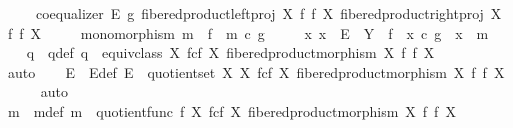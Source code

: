 \begin{isabellebody}
\ \ \ \ {\isasymand}\ coequalizer\ E\ g\ {\isacharparenleft}{\kern0pt}fibered{\isacharunderscore}{\kern0pt}product{\isacharunderscore}{\kern0pt}left{\isacharunderscore}{\kern0pt}proj\ X\ f\ f\ X{\isacharparenright}{\kern0pt}\ {\isacharparenleft}{\kern0pt}fibered{\isacharunderscore}{\kern0pt}product{\isacharunderscore}{\kern0pt}right{\isacharunderscore}{\kern0pt}proj\ X\ f\ f\ X{\isacharparenright}{\kern0pt}\isanewline
\ \ \ \ {\isasymand}\ monomorphism\ m\ {\isasymand}\ f\ {\isacharequal}{\kern0pt}\ m\ {\isasymcirc}\isactrlsub c\ g\isanewline
\ \ \ \ {\isasymand}\ {\isacharparenleft}{\kern0pt}{\isasymforall}x{\isachardot}{\kern0pt}\ x\ {\isacharcolon}{\kern0pt}\ E\ {\isasymrightarrow}\ Y\ {\isasymlongrightarrow}\ f\ {\isacharequal}{\kern0pt}\ x\ {\isasymcirc}\isactrlsub c\ g\ {\isasymlongrightarrow}\ x\ {\isacharequal}{\kern0pt}\ m{\isacharparenright}{\kern0pt}{\isachardoublequoteclose}\isanewline
%
\isadelimproof
%
\endisadelimproof
%
\isatagproof
{}\isamarkupfalse%
\ {\isacharminus}{\kern0pt}\isanewline
\ \ \isamarkupfalse%
\ q\ \ q{\isacharunderscore}{\kern0pt}def{\isacharcolon}{\kern0pt}\ {\isachardoublequoteopen}q\ {\isacharequal}{\kern0pt}\ equiv{\isacharunderscore}{\kern0pt}class\ {\isacharparenleft}{\kern0pt}X\ \isactrlbsub f\isactrlesub {\isasymtimes}\isactrlsub c\isactrlbsub f\isactrlesub \ X{\isacharcomma}{\kern0pt}\ fibered{\isacharunderscore}{\kern0pt}product{\isacharunderscore}{\kern0pt}morphism\ X\ f\ f\ X{\isacharparenright}{\kern0pt}{\isachardoublequoteclose}\isanewline
\ \ \ \ \isamarkupfalse%
\ auto\isanewline
\ \ \isamarkupfalse%
\ E\ \ E{\isacharunderscore}{\kern0pt}def{\isacharcolon}{\kern0pt}\ {\isachardoublequoteopen}E\ {\isacharequal}{\kern0pt}\ quotient{\isacharunderscore}{\kern0pt}set\ X\ {\isacharparenleft}{\kern0pt}X\ \isactrlbsub f\isactrlesub {\isasymtimes}\isactrlsub c\isactrlbsub f\isactrlesub \ X{\isacharcomma}{\kern0pt}\ fibered{\isacharunderscore}{\kern0pt}product{\isacharunderscore}{\kern0pt}morphism\ X\ f\ f\ X{\isacharparenright}{\kern0pt}{\isachardoublequoteclose}\isanewline
\ \ \ \ \isamarkupfalse%
\ auto\isanewline
\ \ \isamarkupfalse%
\ m\ \ m{\isacharunderscore}{\kern0pt}def{\isacharcolon}{\kern0pt}\ {\isachardoublequoteopen}m\ {\isacharequal}{\kern0pt}\ quotient{\isacharunderscore}{\kern0pt}func\ f\ {\isacharparenleft}{\kern0pt}X\ \isactrlbsub f\isactrlesub {\isasymtimes}\isactrlsub c\isactrlbsub f\isactrlesub \ X{\isacharcomma}{\kern0pt}\ fibered{\isacharunderscore}{\kern0pt}product{\isacharunderscore}{\kern0pt}morphism\ X\ f\ f\ X{\isacharparenright}{\kern0pt}{\isachardoublequoteclose}\isanewline

\end{isabellebody}
